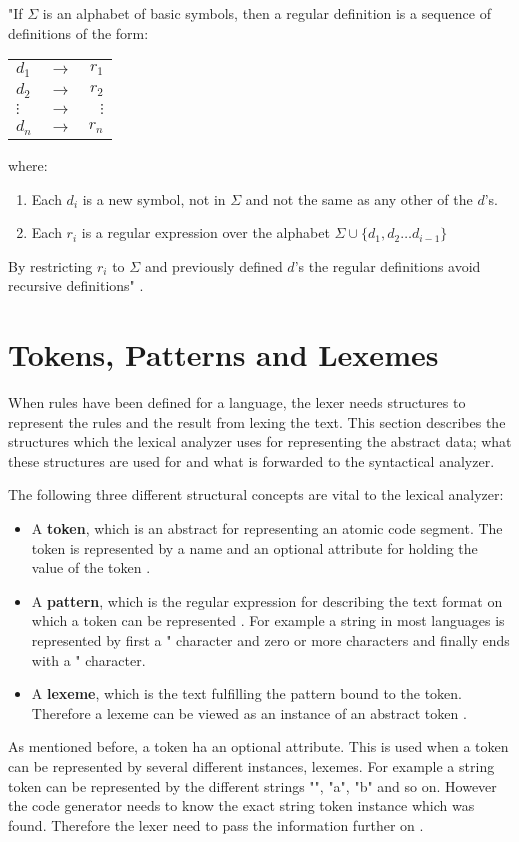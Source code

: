 "If $\Sigma$ is an alphabet of
basic symbols, then a regular definition is a sequence of definitions of the
form:
\begin{center}
\begin{tabular}{l c r}
$d_1$ & $\to$ & $r_1$\\
$d_2$ & $\to$ & $r_2$\\
$\vdots$ & $\to$ & $\vdots$\\
$d_n$ & $\to$ & $r_n$\\

\end{tabular}
\end{center}
where:
\begin{enumerate}
\item Each $d_i$ is a new symbol, not in $\Sigma$ and not the same as any other
of the $d$'s.
\item Each $r_i$ is a regular expression over the alphabet $\Sigma  \cup \{d_1,
d_2 \dots d_{i-1}\}$
\end{enumerate}
By restricting $r_i$ to $\Sigma$ and previously defined $d$'s the regular
definitions avoid recursive definitions" \cite{Aho2006}.

\section{Tokens, Patterns and Lexemes}
When rules have been defined for a language, the lexer needs structures to
represent the rules and the result from lexing the text.
This section describes the structures which the lexical analyzer uses
for representing the abstract data; what these structures are used for and what is
forwarded to the syntactical analyzer.

The following three different structural concepts are vital to the lexical
analyzer:
\begin{itemize}
  \item A \textbf{token}, which is an abstract for representing an atomic code
  segment. The token is represented by a name and an optional attribute for
  holding the value of the token \cite{Aho2006}.
  \item A \textbf{pattern}, which is the regular expression for describing the
  text format on which a token can be represented \cite{Aho2006}. For example a
  string in most languages is represented by first a " character and zero or 
  more characters and finally ends with a " character.
  \item A \textbf{lexeme}, which is the text fulfilling the pattern bound to 
  the token. Therefore a lexeme can be viewed as an instance of an abstract 
  token \cite{Aho2006}.
\end{itemize}
As mentioned before, a token ha an optional attribute. This is used when a 
token can be represented by several different instances, lexemes. For example a 
string token can be represented by the different strings "", "a", "b" and so 
on. However the code generator needs to know the exact string token instance 
which was found. Therefore the lexer need to pass the information further on \cite{Aho2006}.

